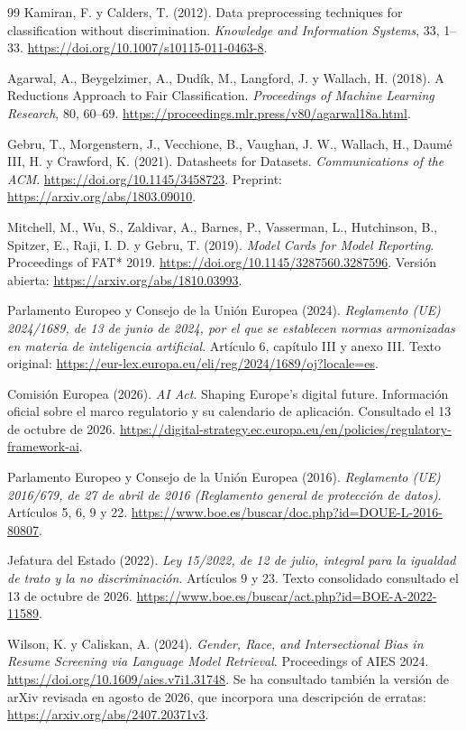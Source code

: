 \begin{thebibliography}{99}
 Kamiran, F. y Calders, T. (2012). Data preprocessing techniques for classification without discrimination. \textit{Knowledge and Information Systems}, 33, 1--33. \url{https://doi.org/10.1007/s10115-011-0463-8}.

 Agarwal, A., Beygelzimer, A., Dudík, M., Langford, J. y Wallach, H. (2018). A Reductions Approach to Fair Classification. \textit{Proceedings of Machine Learning Research}, 80, 60--69. \url{https://proceedings.mlr.press/v80/agarwal18a.html}.

 Gebru, T., Morgenstern, J., Vecchione, B., Vaughan, J. W., Wallach, H., Daumé III, H. y Crawford, K. (2021). Datasheets for Datasets. \textit{Communications of the ACM}. \url{https://doi.org/10.1145/3458723}. Preprint: \url{https://arxiv.org/abs/1803.09010}.

 Mitchell, M., Wu, S., Zaldivar, A., Barnes, P., Vasserman, L., Hutchinson, B., Spitzer, E., Raji, I. D. y Gebru, T. (2019). \textit{Model Cards for Model Reporting}. Proceedings of FAT* 2019. \url{https://doi.org/10.1145/3287560.3287596}. Versión abierta: \url{https://arxiv.org/abs/1810.03993}.

 Parlamento Europeo y Consejo de la Unión Europea (2024). \textit{Reglamento (UE) 2024/1689, de 13 de junio de 2024, por el que se establecen normas armonizadas en materia de inteligencia artificial}. Artículo 6, capítulo III y anexo III. Texto original: \url{https://eur-lex.europa.eu/eli/reg/2024/1689/oj?locale=es}.

 Comisión Europea (2026). \textit{AI Act}. Shaping Europe's digital future. Información oficial sobre el marco regulatorio y su calendario de aplicación. Consultado el 13 de octubre de 2026. \url{https://digital-strategy.ec.europa.eu/en/policies/regulatory-framework-ai}.

 Parlamento Europeo y Consejo de la Unión Europea (2016). \textit{Reglamento (UE) 2016/679, de 27 de abril de 2016 (Reglamento general de protección de datos)}. Artículos 5, 6, 9 y 22. \url{https://www.boe.es/buscar/doc.php?id=DOUE-L-2016-80807}.

 Jefatura del Estado (2022). \textit{Ley 15/2022, de 12 de julio, integral para la igualdad de trato y la no discriminación}. Artículos 9 y 23. Texto consolidado consultado el 13 de octubre de 2026. \url{https://www.boe.es/buscar/act.php?id=BOE-A-2022-11589}.

 Wilson, K. y Caliskan, A. (2024). \textit{Gender, Race, and Intersectional Bias in Resume Screening via Language Model Retrieval}. Proceedings of AIES 2024. \url{https://doi.org/10.1609/aies.v7i1.31748}. Se ha consultado también la versión de arXiv revisada en agosto de 2026, que incorpora una descripción de erratas: \url{https://arxiv.org/abs/2407.20371v3}.


\end{thebibliography}
